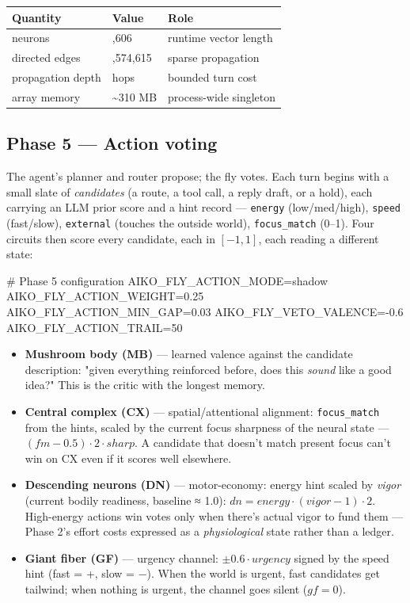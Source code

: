 \documentclass[11pt]{article}
\begin{document}
{\small
{}
\begin{longtable}{@{}>{\raggedright\arraybackslash}p{} >{\raggedright\arraybackslash}p{} >{\raggedright\arraybackslash}p{}@{}}
\toprule
\textbf{Quantity} & \textbf{Value} & \textbf{Role} \\
\midrule
neurons & 166,606 & runtime vector length \\
directed edges & 25,574,615 & sparse propagation \\
propagation depth & 2 hops & bounded turn cost \\
array memory & \textasciitilde{}310 MB & process-wide singleton \\
\bottomrule
\end{longtable}
}

\subsection{Phase 5 — Action voting}

The agent's planner and router propose; the fly votes. Each turn begins with a small slate of \emph{candidates} (a route, a tool call, a reply draft, or a hold), each carrying an LLM prior score and a hint record — \texttt{energy} (low/med/high), \texttt{speed} (fast/slow), \texttt{external} (touches the outside world), \texttt{focus\_match} (0–1). Four circuits then score every candidate, each in \([-1, 1]\), each reading a different state:

\begin{CodeBlock}
# Phase 5 configuration
AIKO_FLY_ACTION_MODE=shadow
AIKO_FLY_ACTION_WEIGHT=0.25
AIKO_FLY_ACTION_MIN_GAP=0.03
AIKO_FLY_VETO_VALENCE=-0.6
AIKO_FLY_ACTION_TRAIL=50
\end{CodeBlock}

\begin{itemize}[leftmargin=*]
\item \textbf{Mushroom body (MB)} — learned valence against the candidate description: "given everything reinforced before, does this \emph{sound} like a good idea?" This is the critic with the longest memory.
\item \textbf{Central complex (CX)} — spatial/attentional alignment: \texttt{focus\_match} from the hints, scaled by the current focus sharpness of the neural state — \((fm - 0.5) \cdot 2 \cdot sharp\). A candidate that doesn't match present focus can't win on CX even if it scores well elsewhere.
\item \textbf{Descending neurons (DN)} — motor-economy: energy hint scaled by \emph{vigor} (current bodily readiness, baseline ≈ 1.0): \(dn = energy \cdot (vigor - 1) \cdot 2\). High-energy actions win votes only when there's actual vigor to fund them — Phase 2's effort costs expressed as a \emph{physiological} state rather than a ledger.
\item \textbf{Giant fiber (GF)} — urgency channel: \(\pm 0.6 \cdot urgency\) signed by the speed hint (fast = +, slow = −). When the world is urgent, fast candidates get tailwind; when nothing is urgent, the channel goes silent (\(gf = 0\)).
\end{itemize}
\end{document}

